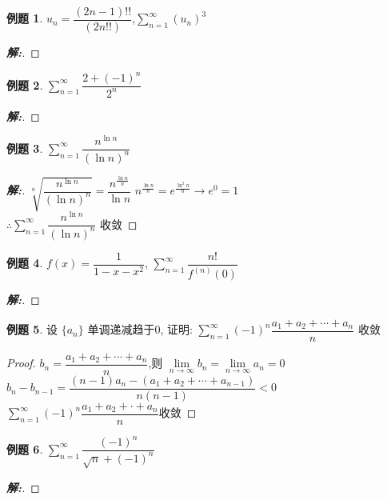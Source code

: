 \documentclass[12pt,a4paper]{ctexart}
\newenvironment{solution}{\begin{proof}[\hspace{2em}\textbf{解:}]}{\end{proof}}
\theoremstyle{definition}%
\newtheorem{exercise}{\hspace{2em}例题}
\begin{document}
\begin{exercise}
	$ u_n=\dfrac{(2n-1)!!}{(2n!!)} $,$ \displaystyle\sum_{n=1}^{\infty}(u_n)^3 $
\end{exercise}
\begin{solution}
	
\end{solution}

\begin{exercise}
	$ \displaystyle\sum_{n=1}^{\infty}\dfrac{2+(-1)^n}{2^n} $
\end{exercise}
\begin{solution}
	
\end{solution}

\begin{exercise}
	$ \displaystyle\sum_{n=1}^{\infty}\dfrac{n^{\ln n}}{(\ln n)^n} $
\end{exercise}
\begin{solution}
	$ \sqrt[n]{\dfrac{n^{\ln n}}{(\ln n)^n}}=\dfrac{n^{\frac{\ln n}{n}}}{\ln n} $
	$ n^{\frac{\ln n}{n}}=e^{\tfrac{\ln^2 n}{n}} \to e^0=1$\\
	
	$ \therefore\displaystyle\sum_{n=1}^{\infty}\dfrac{n^{\ln n}}{(\ln n)^n} $ 收敛
\end{solution}

\begin{exercise}
	$ f(x)=\dfrac{1}{1-x-x^2} $, $ \displaystyle\sum_{n=1}^{\infty}\dfrac{n!}{f^{(n)}(0)} $
\end{exercise}
\begin{solution}
	
\end{solution}

\begin{exercise}
	设 $ \{a_n\} $ 单调递减趋于0, 证明: $ \displaystyle\sum_{n=1}^{\infty} (-1)^n \dfrac{a_1+a_2+\cdots+a_n}{n} $ 收敛
\end{exercise}
\begin{proof}
	$ b_n=\dfrac{a_1+a_2+\cdots+a_n}{n} $,则 $ \lim\limits_{n \to \infty}b_n=\lim\limits_{n \to \infty}a_n=0 $\\
	
	$ b_n-b_{n-1}=\dfrac{(n-1)a_n-(a_1+a_2+\cdots+a_{n-1})}{n(n-1)}<0 $\\
	
	$ \displaystyle\sum_{n=1}^{\infty}(-1)^n\dfrac{a_1+a_2+\cdot+a_n}{n} $收敛
\end{proof}

\begin{exercise}
	$ \displaystyle\sum_{n=1}^{\infty} \dfrac{(-1)^n}{\sqrt{n}+(-1)^n} $
\end{exercise}
\begin{solution}
	
\end{solution}
\end{document}
